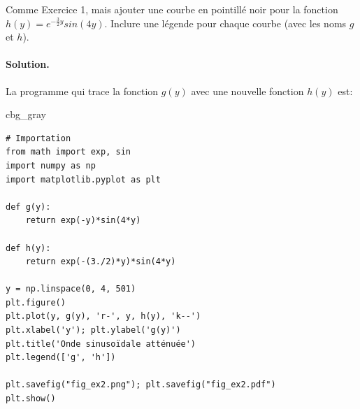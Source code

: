 \documentclass[%
oneside,                 %
final,                   %
10pt,french]{article}
\newenvironment{_cod_tight}[1]{
   \def\FrameCommand{\colorbox{#1}}
   \FrameRule0.6pt\MakeFramed {\FrameRestore}\vskip3mm}
   {\vskip0mm\endMakeFramed}
\newenvironment{cod}[1]{
\bgroup\rmfamily
\fboxsep=0mm\relax
\begin{_cod_tight}{#1}
\list{}{\parsep=-2mm\parskip=0mm\topsep=0pt\leftmargin=2mm
\rightmargin=2\leftmargin\leftmargin=4pt\relax}
\item\relax}
{\endlist\end{_cod_tight}\egroup}
\newenvironment{doconceexercise}{}{}
\newcounter{doconceexercisecounter}
\begin{document}
\begin{doconceexercise}



Comme Exercice 1, mais ajouter une courbe en pointillé noir pour la fonction $h(y) = e^{-\frac{3}{2}y} sin(4y)$. Inclure une légende pour chaque courbe (avec les noms $g$ et $h$).


\paragraph{Solution.}
La programme qui trace la fonction $g(y)$ avec une nouvelle fonction $h(y)$ est:
\begin{cod}{cbg_gray}\begin{verbatim}
# Importation
from math import exp, sin
import numpy as np
import matplotlib.pyplot as plt

def g(y):
    return exp(-y)*sin(4*y)

def h(y):
    return exp(-(3./2)*y)*sin(4*y)

y = np.linspace(0, 4, 501)
plt.figure()
plt.plot(y, g(y), 'r-', y, h(y), 'k--')
plt.xlabel('y'); plt.ylabel('g(y)')
plt.title('Onde sinusoïdale atténuée')
plt.legend(['g', 'h'])

plt.savefig("fig_ex2.png"); plt.savefig("fig_ex2.pdf")
plt.show()
\end{verbatim}
\end{cod}
\noindent


\end{doconceexercise}
\end{document}
